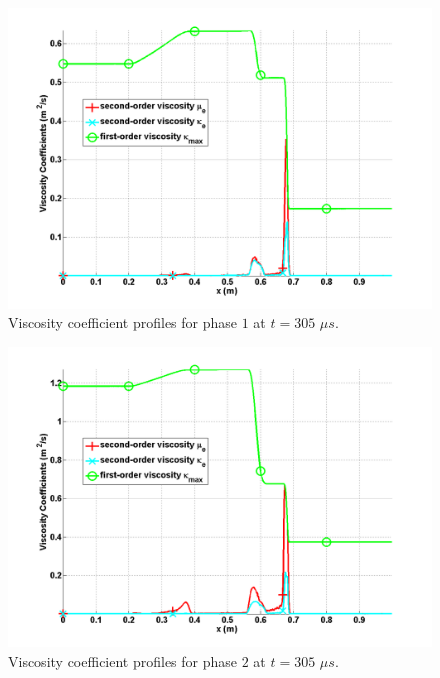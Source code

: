 \begin{figure}[H]
\centering
\includegraphics[width=\textwidth]{figures/relaxation_two_phases_liquid_viscosity_kappa_mu.png}
\caption{Viscosity coefficient profiles for phase $1$ at $t=305$ $\mu s$.}
\label{fig:two-fluids-rel-visc-2-7-eqn-sect4}
\end{figure}
%
\begin{figure}[H]
\centering
\includegraphics[width=\textwidth]{figures/relaxation_two_phases_vapor_viscosity_kappa_mu.png}
\caption{Viscosity coefficient profiles for phase $2$ at $t=305$ $\mu s$.}
\label{fig:two-fluids-rel-visc-1-7-eqn-sect4}
\end{figure}
%
